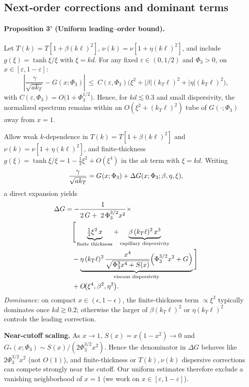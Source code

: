 \documentclass[aps,pre,twocolumn,showpacs,superscriptaddress]{revtex4-2}
\theoremstyle{definition}
\begin{document}
\subsection{Next‑order corrections and dominant terms}\label{subsec:corrections}

\paragraph*{Proposition 3' (Uniform leading–order bound).}
Let $T(k)=T[1+\beta (k\ell)^2]$, $\nu(k)=\nu[1+\eta (k\ell)^2]$, and include $g(\xi)=\tanh\xi/\xi$ with $\xi=kd$. 
For any fixed $\varepsilon\in(0,1/2)$ and $\Phi_3>0$, on $x\in[\varepsilon,1-\varepsilon]$:
\[
\left|\frac{\gamma}{\sqrt{a k_T}} - G(x;\Phi_3)\right|
\ \le\ C(\varepsilon,\Phi_3)\Big(\xi^2 + |\beta| (k_T\ell)^2 + |\eta| (k_T\ell)^2\Big),
\]
with $C(\varepsilon,\Phi_3)=O\!\big(1+\Phi_3^{1/2}\big)$. Hence, for $kd\!\lesssim\!0.3$ and small dispersivity, the normalized spectrum remains within an $O(\xi^2+(k_T\ell)^2)$ tube of $G(\cdot;\Phi_3)$ away from $x\!=\!1$.

Allow weak $k$‑dependence in $T(k)=T[1+\beta(k\ell)^2]$ and $\nu(k)=\nu[1+\eta(k\ell)^2]$, and finite‑thickness $g(\xi)=\tanh\xi/\xi=1-\tfrac13\xi^2+O(\xi^4)$ in the $ak$ term with $\xi=kd$. Writing
\[
\frac{\gamma}{\sqrt{a k_T}}=G_{\*}(x;\Phi_3)+\Delta G(x;\Phi_3;\beta,\eta,\xi),
\]
a direct expansion yields
\begin{align}
\Delta G &= -\frac{1}{2\,G_{\*}+\;2\,\Phi_3^{3/2}x^2}\times \nonumber\\
&\quad\Bigg[
\underbrace{\tfrac{1}{3}\xi^2\,x}_{\text{finite thickness}}
+\underbrace{\beta\,(k_T\ell)^2\,x^3}_{\text{capillary dispersivity}} \nonumber\\
&\quad-\underbrace{\eta\,(k_T\ell)^2\,\frac{x^4}{\sqrt{\Phi_3^3 x^4+S(x)}}\Big(\Phi_3^{3/2}x^2+G_{\*}\Big)}_{\text{viscous dispersivity}}
\Bigg] \nonumber\\
&\quad + O\!\big(\xi^4,\beta^2,\eta^2\big).
\end{align}
\emph{Dominance:} on compact $x\in(\epsilon,1-\epsilon)$, the finite‑thickness term $\propto \xi^2$ typically dominates once $kd\gtrsim 0.2$; otherwise the larger of $\beta(k_T\ell)^2$ or $\eta(k_T\ell)^2$ controls the leading correction.

\noindent\textbf{Near-cutoff scaling.}
As $x\to 1$, $S(x)=x(1-x^2)\to 0$ and $G_{\ast}(x;\Phi_3)\sim S(x)/(2\Phi_3^{3/2}x^2)$. Hence the denominator in $\Delta G$ behaves like $2\Phi_3^{3/2}x^2$ (not $O(1)$), and finite-thickness or $T(k),\nu(k)$ dispersive corrections can compete strongly near the cutoff. Our uniform estimates therefore exclude a vanishing neighborhood of $x=1$ (we work on $x\in[\varepsilon,1-\varepsilon]$).
\end{document}
